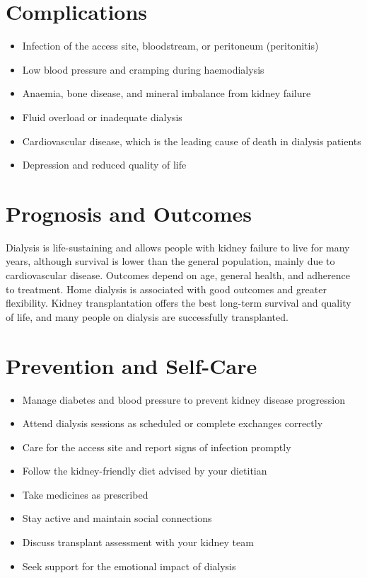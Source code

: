 \section*{Complications}
\begin{itemize}
    \item Infection of the access site, bloodstream, or peritoneum (peritonitis)
    \item Low blood pressure and cramping during haemodialysis
    \item Anaemia, bone disease, and mineral imbalance from kidney failure
    \item Fluid overload or inadequate dialysis
    \item Cardiovascular disease, which is the leading cause of death in dialysis patients
    \item Depression and reduced quality of life
\end{itemize}

\section*{Prognosis and Outcomes}
Dialysis is life-sustaining and allows people with kidney failure to live for many years, although survival is lower than the general population, mainly due to cardiovascular disease. Outcomes depend on age, general health, and adherence to treatment. Home dialysis is associated with good outcomes and greater flexibility. Kidney transplantation offers the best long-term survival and quality of life, and many people on dialysis are successfully transplanted.

\section*{Prevention and Self-Care}
\begin{itemize}
    \item Manage diabetes and blood pressure to prevent kidney disease progression
    \item Attend dialysis sessions as scheduled or complete exchanges correctly
    \item Care for the access site and report signs of infection promptly
    \item Follow the kidney-friendly diet advised by your dietitian
    \item Take medicines as prescribed
    \item Stay active and maintain social connections
    \item Discuss transplant assessment with your kidney team
    \item Seek support for the emotional impact of dialysis
\end{itemize}

